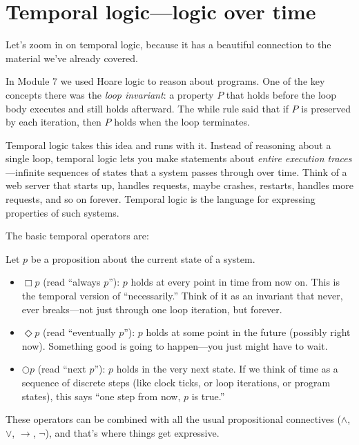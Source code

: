 \documentclass[11pt]{article}
\begin{document}
\section{Temporal logic---logic over time}

Let's zoom in on temporal logic, because it has a beautiful connection to the material we've already covered.

In Module 7 we used Hoare logic to reason about programs. One of the key concepts there was the \emph{loop invariant}: a property $P$ that holds before the loop body executes and still holds afterward. The while rule said that if $P$ is preserved by each iteration, then $P$ holds when the loop terminates.

Temporal logic takes this idea and runs with it. Instead of reasoning about a single loop, temporal logic lets you make statements about \emph{entire execution traces}---infinite sequences of states that a system passes through over time. Think of a web server that starts up, handles requests, maybe crashes, restarts, handles more requests, and so on forever. Temporal logic is the language for expressing properties of such systems.

The basic temporal operators are:

\begin{definition}
Let $p$ be a proposition about the current state of a system.
\begin{itemize}
  \item $\Box p$ (read ``always $p$''): $p$ holds at every point in time from now on. This is the temporal version of ``necessarily.'' Think of it as an invariant that never, ever breaks---not just through one loop iteration, but forever.
  \item $\Diamond p$ (read ``eventually $p$''): $p$ holds at some point in the future (possibly right now). Something good is going to happen---you just might have to wait.
  \item $\bigcirc p$ (read ``next $p$''): $p$ holds in the very next state. If we think of time as a sequence of discrete steps (like clock ticks, or loop iterations, or program states), this says ``one step from now, $p$ is true.''
\end{itemize}
\end{definition}

These operators can be combined with all the usual propositional connectives ($\wedge$, $\vee$, $\to$, $\lnot$), and that's where things get expressive.
\end{document}
